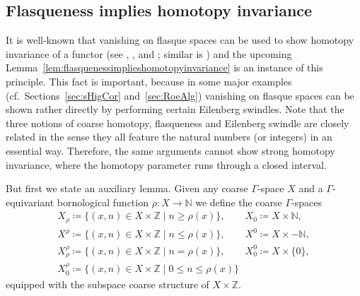 \documentclass[pdftex]{sigma}
\numberwithin{equation}{section}
\theoremstyle{definition}
\newcommand{\N}{\mathbb{N}}
\newcommand{\Z}{\mathbb{Z}}
\begin{document}
\subsection{Flasqueness implies homotopy invariance}
\label{sec:flasquenessimplieshomotopyinvariance}

It is well-known that vanishing on flasque spaces can be used to show homotopy invariance of a functor (see \cite[Theorem~9.8]{RoeITCGTM}, \cite[Theorem~11.2]{HigsonPedersenRoe}, \cite[Proposition~3.10]{WillettHomological} and \cite[Proposition~4.16]{BunkeEngel_homotopy}; similar is \cite[Proposition~12.4.12]{HigRoe}) and the upcoming Lemma~\ref{lem:flasquenessimplieshomotopyinvariance} is an instance of this principle.
This fact is important, because in some major examples (cf.\ Sections~\ref{sec:sHigCor} and~\ref{sec:RoeAlg}) vanishing on flasque spaces can be shown rather directly by performing certain Eilenberg swindles.
Note that the three notions of coarse homotopy, flasqueness and Eilenberg swindle are closely related in the sense they all feature the natural numbers (or integers) in an essential way. Therefore, the same arguments cannot show strong homotopy invariance, where the homotopy parameter runs through a closed interval.

But first we state an auxiliary lemma. Given any coarse $\Gamma$-space $X$ and a $\Gamma$-equivariant bornological function $\rho\colon X\to\N$ we define the coarse $\Gamma$-spaces
\begin{gather*}
X_{\rho}\coloneqq\{(x,n)\in X\times \Z\mid n\geq\rho(x)\}, \qquad X_{0}\coloneqq X\times \N,
\\
X^{\rho}\coloneqq\{(x,n)\in X\times \Z\mid n\leq\rho(x)\}, \qquad X^{0}\coloneqq X\times -\N,
\\
X_\rho^\rho\coloneqq\{(x,n)\in X\times \Z\mid n=\rho(x)\}, \qquad X_0^{0}\coloneqq X\times \{0\},
\\
X_0^{\rho}\coloneqq\{(x,n)\in X\times \Z\mid 0\leq n\leq\rho(x)\}
\end{gather*}
equipped with the subspace coarse structure of $X\times \Z$.
\end{document}
